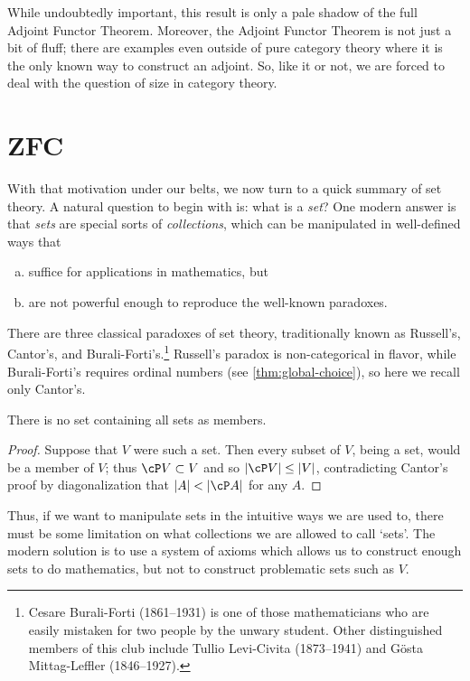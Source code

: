 \documentclass[12pt]{amsart}
\begin{document}
While undoubtedly important, this result is only a pale shadow of the
full Adjoint Functor Theorem.  Moreover, the Adjoint Functor Theorem
is not just a bit of fluff; there are examples even outside of pure
category theory where it is the only known way to construct an
adjoint.  So, like it or not, we are forced to deal with the question
of size in category theory.


\section{ZFC}
\label{sec:zfc}

With that motivation under our belts, we now turn to a quick summary
of set theory.  A natural question to begin with is: what is a
\emph{set}?  One modern answer is that \emph{sets} are special sorts
of \emph{collections}, which can be manipulated in well-defined ways
that
\begin{enumerate}[(a)]
\item suffice for applications in mathematics, but
\item are not powerful enough to reproduce the well-known paradoxes.
\end{enumerate}
There are three classical paradoxes of set theory, traditionally known
as Russell's, Cantor's, and Burali-Forti's.\footnote{Cesare
  Burali-Forti (1861--1931) is one of those mathematicians who are
  easily mistaken for two people by the unwary student.  Other
  distinguished members of this club include Tullio Levi-Civita
  (1873--1941) and G\"osta Mittag-Leffler (1846--1927).}  Russell's
paradox is non-categorical in flavor, while Burali-Forti's requires
ordinal numbers (see \autoref{thm:global-choice}), so here we recall
only Cantor's.

\begin{thm}
  There is no set containing all sets as members.
\end{thm}
\begin{proof}
  Suppose that $V$ were such a set.  Then every subset of $V$, being a
  set, would be a member of $V$; thus $\cP V \subset V$ and so
  $|\cP V| \le |V|$, contradicting Cantor's proof by diagonalization
  that $|A|<|\cP A|$ for any $A$.
\end{proof}

Thus, if we want to manipulate sets in the intuitive ways we are used
to, there must be some limitation on what collections we are allowed
to call `sets'.  The modern solution is to use a system of axioms
which allows us to construct enough sets to do mathematics, but not to
construct problematic sets such as $V$.
\end{document}
